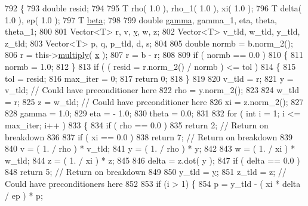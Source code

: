 \begin{DoxyCode}
792   \{
793     \textcolor{keywordtype}{double} resid;
794 
795     T rho( 1.0 ), rho\_1( 1.0 ), xi( 1.0 );
796     T delta( 1.0 ), ep( 1.0 );
797     T \hyperlink{namespaceLuna_af542f1c7522ca96017105e160b54df80}{beta};
798 
799     \textcolor{keywordtype}{double} \hyperlink{namespaceLuna_a4467788060a97debe131fa8f08a00de3}{gamma}, gamma\_1, eta, theta, theta\_1;
800 
801     Vector<T> r, v, \hyperlink{ODE__BVP__test_8cpp_adf764cbdea00d65edcd07bb9953ad2b7ae1f9fdb8b786c63efc4ce44eeacd17f2}{y}, w, z;
802     Vector<T> v\_tld, w\_tld, y\_tld, z\_tld;
803     Vector<T> p, q, p\_tld, d, s;
804 
805     \textcolor{keywordtype}{double} normb = b.norm\_2();
806     r = this->\hyperlink{classLuna_1_1SparseMatrix_a532c8a8b80b0accf950a642344e7954f}{multiply}( \hyperlink{namespaceHeat__plot_aa88370c16b85b784ccbde3ed88bc1991}{x} );
807     r = b - r;
808 
809     \textcolor{keywordflow}{if} ( normb == 0.0 )
810     \{
811       normb = 1.0;
812     \}
813     \textcolor{keywordflow}{if} ( ( resid = r.norm\_2() / normb ) <= tol )
814     \{
815       tol = resid;
816       max\_iter = 0;
817       \textcolor{keywordflow}{return} 0;
818     \}
819 
820     v\_tld = r;
821     y = v\_tld; \textcolor{comment}{// Could have preconditioner here}
822     rho = y.norm\_2();
823 
824     w\_tld = r;
825     z = w\_tld; \textcolor{comment}{// Could have preconditioner here}
826     xi = z.norm\_2();
827 
828     gamma = 1.0;
829     eta = - 1.0;
830     theta = 0.0;
831 
832     \textcolor{keywordflow}{for} ( \textcolor{keywordtype}{int} i = 1; i <= max\_iter; i++ )
833     \{
834       \textcolor{keywordflow}{if} ( rho == 0.0 )
835         \textcolor{keywordflow}{return} 2;                     \textcolor{comment}{// Return on breakdown}
836 
837       \textcolor{keywordflow}{if} ( xi == 0.0 )
838         \textcolor{keywordflow}{return} 7;                     \textcolor{comment}{// Return on breakdown}
839 
840       v = ( 1. / rho ) * v\_tld;
841       y = ( 1. / rho ) * y;
842 
843       w = ( 1. / xi ) * w\_tld;
844       z = ( 1. / xi ) * z;
845 
846       delta = z.dot( y );
847       \textcolor{keywordflow}{if} ( delta == 0.0 )
848         \textcolor{keywordflow}{return} 5;                     \textcolor{comment}{// Return on breakdown}
849 
850       y\_tld = \hyperlink{ODE__BVP__test_8cpp_adf764cbdea00d65edcd07bb9953ad2b7ae1f9fdb8b786c63efc4ce44eeacd17f2}{y};
851       z\_tld = z;  \textcolor{comment}{// Could have preconditioners here}
852 
853       \textcolor{keywordflow}{if} (i > 1) \{
854         p = y\_tld - ( xi * delta / ep ) * p;

\end{DoxyCode}
